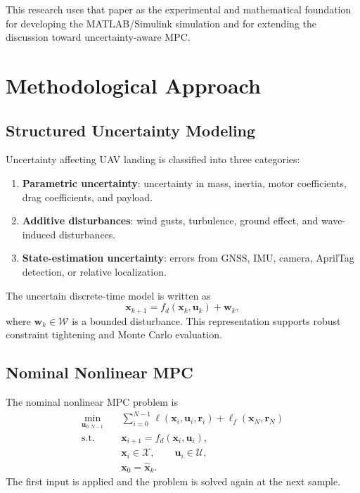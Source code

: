 \documentclass[12pt,a4paper]{report}
\begin{document}
This research uses that paper as the experimental and mathematical foundation for developing the MATLAB/Simulink simulation and for extending the discussion toward uncertainty-aware MPC.

\chapter{Methodological Approach}

\section{Structured Uncertainty Modeling}
Uncertainty affecting UAV landing is classified into three categories:
\begin{enumerate}
    \item \textbf{Parametric uncertainty}: uncertainty in mass, inertia, motor coefficients, drag coefficients, and payload.
    \item \textbf{Additive disturbances}: wind gusts, turbulence, ground effect, and wave-induced disturbances.
    \item \textbf{State-estimation uncertainty}: errors from GNSS, IMU, camera, AprilTag detection, or relative localization.
\end{enumerate}

The uncertain discrete-time model is written as
\begin{equation}
\bm{x}_{k+1}=f_d(\bm{x}_k,\bm{u}_k)+\bm{w}_k,
\end{equation}
where $\bm{w}_k\in\mathcal{W}$ is a bounded disturbance. This representation supports robust constraint tightening and Monte Carlo evaluation.

\section{Nominal Nonlinear MPC}
The nominal nonlinear MPC problem is
\begin{align}
\min_{\bm{u}_{0:N-1}} \quad
& \sum_{i=0}^{N-1}
\ell(\bm{x}_i,\bm{u}_i,\bm{r}_i)
+\ell_f(\bm{x}_N,\bm{r}_N)\\
\text{s.t.}\quad
& \bm{x}_{i+1}=f_d(\bm{x}_i,\bm{u}_i),\\
& \bm{x}_i\in\mathcal{X},\qquad \bm{u}_i\in\mathcal{U},\\
& \bm{x}_0=\hat{\bm{x}}_k.
\end{align}
The first input is applied and the problem is solved again at the next sample.
\end{document}
